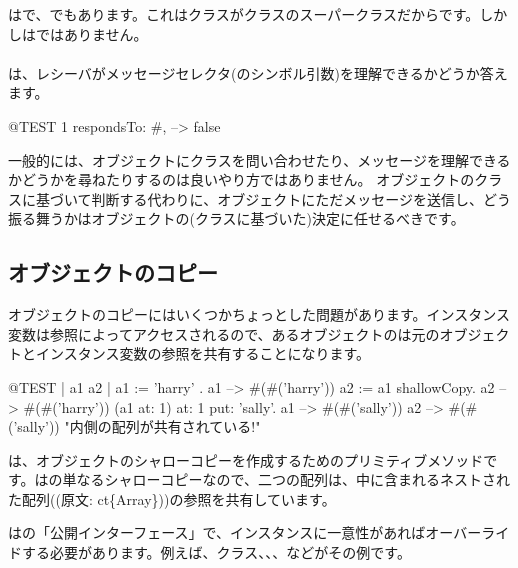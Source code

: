 \documentclass[a4paper,10pt,twoside]{book}
\begin{document}
はで、でもあります。これはクラスがクラスのスーパークラスだからです。しかしはではありません。

\paragraph{}
は、レシーバがメッセージセレクタ(のシンボル引数)を理解できるかどうか答えます。

\begin{code}{@TEST}
1 respondsTo: #, --> false
\end{code}

一般的には、オブジェクトにクラスを問い合わせたり、メッセージを理解できるかどうかを尋ねたりするのは良いやり方ではありません。
オブジェクトのクラスに基づいて判断する代わりに、オブジェクトにただメッセージを送信し、どう振る舞うかはオブジェクトの(クラスに基づいた)決定に任せるべきです。

\subsection{オブジェクトのコピー}

オブジェクトのコピーにはいくつかちょっとした問題があります。インスタンス変数は参照によってアクセスされるので、あるオブジェクトのは元のオブジェクトとインスタンス変数の参照を共有することになります。

\begin{code}{@TEST | a1 a2 |}
a1 := { { 'harry' } }.
a1 --> #(#('harry'))
a2 := a1 shallowCopy.
a2 --> #(#('harry'))
(a1 at: 1) at: 1 put: 'sally'.
a1 --> #(#('sally'))
a2 --> #(#('sally'))    "内側の配列が共有されている!"
\end{code}

は、オブジェクトのシャローコピーを作成するためのプリミティブメソッドです。はの単なるシャローコピーなので、二つの配列は、中に含まれるネストされた配列((原文: ct\{Array\}))の参照を共有しています。

はの「公開インターフェース」で、インスタンスに一意性があればオーバーライドする必要があります。例えば、クラス、、、などがその例です。
\end{document}
